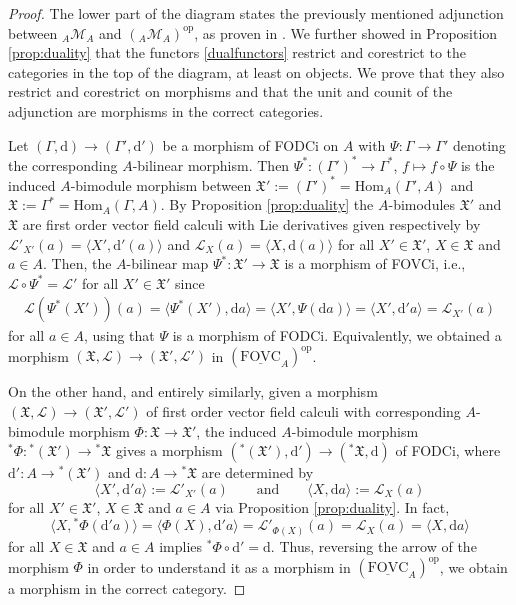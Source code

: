 \documentclass{article}
\theoremstyle{definition}
\begin{document}
	\begin{proof}
		The lower part of the diagram states the previously mentioned adjunction between ${}_A\mathcal{M}_A$ and $({}_A\mathcal{M}_A)^\mathrm{op}$, as proven in \cite[Proposition 9]{PoinsotPorst}. We further showed in Proposition \ref{prop:duality} that the functors \eqref{dualfunctors} restrict and corestrict to the categories in the top of the diagram, at least on objects. We prove that they also restrict and corestrict on morphisms and that the unit and counit of the adjunction are morphisms in the correct categories.
		
		Let $(\Gamma,\mathrm{d})\to(\Gamma',\mathrm{d}')$ be a morphism of FODCi on $A$ with $\Psi\colon\Gamma\to\Gamma'$ denoting the corresponding $A$-bilinear morphism. Then $\Psi^*\colon(\Gamma')^*\to\Gamma^*$, $f\mapsto f\circ\Psi$ is the induced $A$-bimodule morphism between $\mathfrak{X}':=(\Gamma')^*=\mathrm{Hom}_A(\Gamma',A)$ and $\mathfrak{X}:=\Gamma^*=\mathrm{Hom}_A(\Gamma,A)$. By Proposition \ref{prop:duality} the $A$-bimodules $\mathfrak{X}'$ and $\mathfrak{X}$ are first order vector field calculi with Lie derivatives given respectively by $\mathscr{L}'_{X'}(a)=\langle X',\mathrm{d}'(a)\rangle$ and $\mathscr{L}_X(a)=\langle X,\mathrm{d}(a)\rangle$ for all $X'\in\mathfrak{X}'$, $X\in\mathfrak{X}$ and $a\in A$. Then, the $A$-bilinear map $\Psi^*\colon\mathfrak{X}'\to\mathfrak{X}$ is a morphism of FOVCi, i.e., $\mathscr{L}\circ\Psi^*=\mathscr{L}'$ for all $X'\in\mathfrak{X}'$ since
		\begin{align*}
			\mathscr{L}(\Psi^*(X'))(a)
			=\langle\Psi^*(X'),\mathrm{d}a\rangle
			=\langle X',\Psi(\mathrm{d}a)\rangle
			=\langle X',\mathrm{d}'a\rangle
			=\mathscr{L}_{X'}(a)
		\end{align*}
		for all $a\in A$, using that $\Psi$ is a morphism of FODCi. Equivalently, we obtained a morphism $(\mathfrak{X},\mathscr{L})\to(\mathfrak{X}',\mathscr{L}')$ in $(\underline{\mathrm{FOVC}}_A)^\mathrm{op}$.
		
		
		On the other hand, and entirely similarly, given a morphism $(\mathfrak{X},\mathscr{L})\to(\mathfrak{X}',\mathscr{L}')$ of first order vector field calculi with corresponding $A$-bimodule morphism $\Phi\colon\mathfrak{X}\to\mathfrak{X}'$, the induced $A$-bimodule morphism ${}^*\Phi\colon{}^*(\mathfrak{X}')\to{}^*\mathfrak{X}$ gives a morphism $({}^*(\mathfrak{X}'),\mathrm{d}')\to({}^*\mathfrak{X},\mathrm{d})$ of FODCi, where $\mathrm{d}'\colon A\to{}^*(\mathfrak{X}')$ and $\mathrm{d}\colon A\to{}^*\mathfrak{X}$ are determined by
		$$
		\langle X',\mathrm{d}'a\rangle:=\mathscr{L}'_{X'}(a)\qquad\text{and}\qquad
		\langle X,\mathrm{d}a\rangle:=\mathscr{L}_{X}(a)
		$$
		for all $X'\in\mathfrak{X}'$, $X\in\mathfrak{X}$ and $a\in A$ via Proposition \ref{prop:duality}. In fact,
		$$
		\langle X,{}^*\Phi(\mathrm{d}'a)\rangle
		=\langle\Phi(X),\mathrm{d}'a\rangle
		=\mathscr{L}'_{\Phi(X)}(a)
		=\mathscr{L}_X(a)
		=\langle X,\mathrm{d}a\rangle
		$$
		for all $X\in\mathfrak{X}$ and $a\in A$ implies ${}^*\Phi\circ\mathrm{d}'=\mathrm{d}$. Thus, reversing the arrow of the morphism $\Phi$ in order to understand it as a morphism in $(\underline{\mathrm{FOVC}}_A)^\mathrm{op}$, we obtain a morphism in the correct category. 
		

\end{proof}
\end{document}
